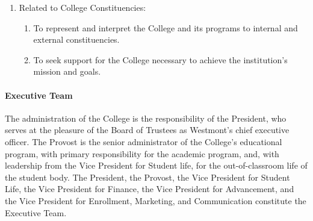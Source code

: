 \begin{enumerate}
{\begin{enumerate}
{\begin{enumerate}
									\item{To make final review and give final administrative approval of College plans, budgets, and policies and to submit appropriate items to the Board of Trustees for adoption.}
								\end{enumerate}
							}
							\item{Related to College Constituencies:
								\begin{enumerate}
									\item{To represent and interpret the College and its programs to internal and external constituencies.}
									\item{To seek support for the College necessary to achieve the institution's mission and goals.}
								\end{enumerate}
							}
						\end{enumerate}
					}
				\end{enumerate}
			\paragraph{Executive Team}

				The administration of the College is the responsibility of the President, who serves at the pleasure of the Board of Trustees as Westmont's chief executive officer.  The Provost is the senior administrator of the College's educational program, with primary responsibility for the academic program, and, with leadership from the Vice President for Student life, for the out-of-classroom life of the student body.  The President, the Provost, the Vice President for Student Life, the Vice President for Finance, the Vice President for Advancement, and the Vice President for Enrollment, Marketing, and Communication constitute the Executive Team.

